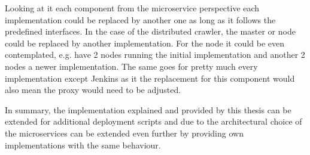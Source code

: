 Looking at it each component from the microservice perspective each implementation could be replaced by another one as long as it follows the predefined interfaces. In the case of the distributed crawler, the master or node could be replaced by another implementation. For the node it could be even contemplated, e.g. have 2 nodes running the initial implementation and another 2 nodes a newer implementation. The same goes for pretty much every implementation except Jenkins as it the replacement for this component would also mean the proxy would need to be adjusted.

In summary, the implementation explained and provided by this thesis can be extended for additional deployment scripts and due to the architectural choice of the microservices can be extended even further by providing own implementations with the same behaviour.
